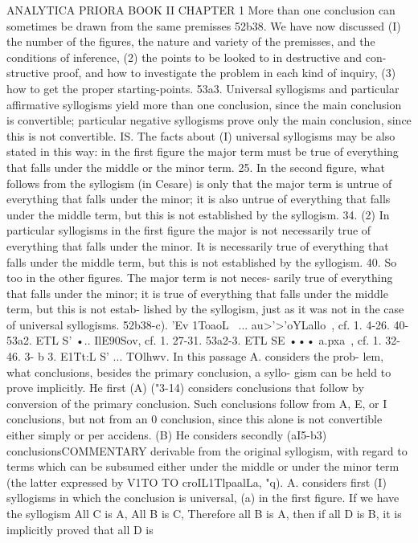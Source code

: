 ANALYTICA PRIORA
BOOK II
CHAPTER 1
More than one conclusion can sometimes be drawn from the same
premisses
52b38. We have now discussed (I) the number of the figures,
the nature and variety of the premisses, and the conditions of
inference, (2) the points to be looked to in destructive and con-
structive proof, and how to investigate the problem in each kind
of inquiry, (3) how to get the proper starting-points.
53a3. Universal syllogisms and particular affirmative syllogisms
yield more than one conclusion, since the main conclusion is
convertible; particular negative syllogisms prove only the main
conclusion, since this is not convertible.
IS. The facts about (I) universal syllogisms may be also stated
in this way: in the first figure the major term must be true of
everything that falls under the middle or the minor term.
25. In the second figure, what follows from the syllogism (in
Cesare) is only that the major term is untrue of everything that
falls under the minor; it is also untrue of everything that falls
under the middle term, but this is not established by the syllogism.
34. (2) In particular syllogisms in the first figure the major is
not necessarily true of everything that falls under the minor. It
is necessarily true of everything that falls under the middle term,
but this is not established by the syllogism.
40. So too in the other figures. The major term is not neces-
sarily true of everything that falls under the minor; it is true of
everything that falls under the middle term, but this is not estab-
lished by the syllogism, just as it was not in the case of universal
syllogisms.
52b38-c). 'Ev 1ToaoL~ ... au>'>'oYLallo~, cf. 1. 4-26.
40-53a2. ETL S' •.. IlE90Sov, cf. 1. 27-31.
53a2-3. ETL SE ••• a.pxa~, cf. 1. 32-46.
3- b 3. E1Tt:L S' ... TOlhwv. In this passage A. considers the prob-
lem, what conclusions, besides the primary conclusion, a syllo-
gism can be held to prove implicitly. He first (A) ("3-14) considers
conclusions that follow by conversion of the primary conclusion.
Such conclusions follow from A, E, or I conclusions, but not from
an 0 conclusion, since this alone is not convertible either simply
or per accidens. (B) He considers secondly (aI5-b3) conclusionsCOMMENTARY
derivable from the original syllogism, with regard to terms which
can be subsumed either under the middle or under the minor term
(the latter expressed by V1TO TO croIL1TlpaalLa, "q). A. considers first
(I) syllogisms in which the conclusion is universal, (a) in the first
figure. If we have the syllogism All C is A, All B is C, Therefore
all B is A, then if all D is B, it is implicitly proved that all D is
